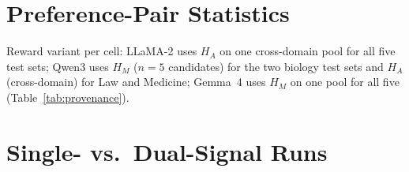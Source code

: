 \section{Preference-Pair Statistics}
\label{sec:pair_stats}
\label{sec:variant_assignment_appendix}



Reward variant per cell: LLaMA-2 uses $H_A$ on one cross-domain pool for all five test sets; Qwen3 uses $H_M$ ($n{=}5$ candidates) for the two biology test sets and $H_A$ (cross-domain) for Law and Medicine; Gemma~4 uses $H_M$ on one pool for all five (Table~\ref{tab:provenance}).

\section{Single- vs.\ Dual-Signal Runs}
\label{sec:single_dual_appendix}



\GSHAREDAPPENDIX


